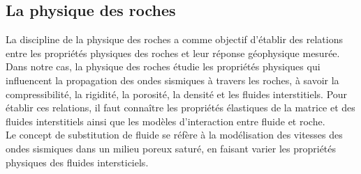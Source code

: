 \subsection{La physique des roches}
La discipline de la physique des roches a comme objectif d'établir des relations
entre les propriétés physiques des roches et leur réponse géophysique mesurée. Dans notre cas,
la physique des roches étudie les propriétés physiques qui influencent la
propagation des ondes sismiques à travers les roches, à savoir la
compressibilité, la rigidité, la porosité, la densité et les fluides
interstitiels. Pour établir ces relations, il faut connaître les propriétés
élastiques de la matrice et des fluides interstitiels ainsi que les modèles
d'interaction entre fluide et roche. \\
Le concept de substitution de fluide se réfère à la modélisation des vitesses
des ondes sismiques dans un milieu poreux saturé, en faisant varier les propriétés physiques des fluides intersticiels.
